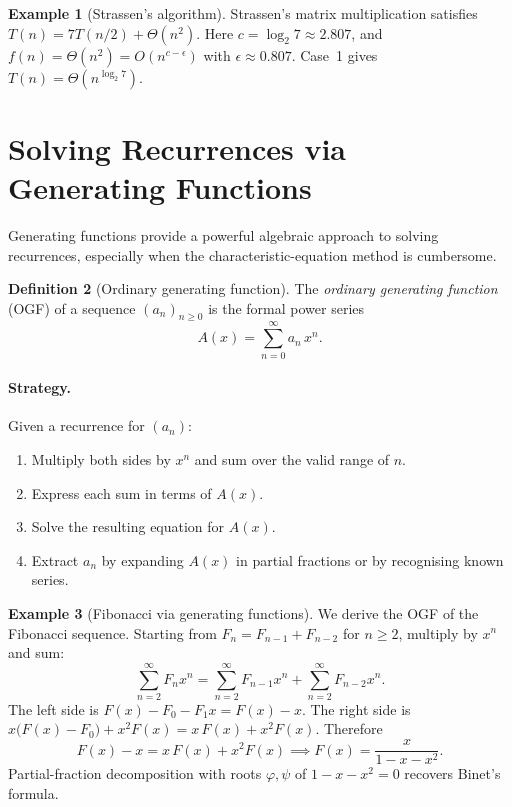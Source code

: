 \documentclass[12pt,a4paper,openany]{book}
\theoremstyle{definition}
\newtheorem{definition}{Definition}[chapter]
\newtheorem{example}[definition]{Example}
\theoremstyle{plain}
\theoremstyle{remark}
\begin{document}
\begin{example}[Strassen's algorithm]\label{ex:strassen}
Strassen's matrix multiplication satisfies $T(n) = 7T(n/2) + \Theta(n^2)$.
Here $c = \log_2 7 \approx 2.807$, and $f(n) = \Theta(n^2) =
O(n^{c - \epsilon})$ with $\epsilon \approx 0.807$.  Case~1 gives
$T(n) = \Theta(n^{\log_2 7})$.
\end{example}

\section{Solving Recurrences via Generating Functions}\label{sec:rec-gf}

Generating functions provide a powerful algebraic approach to solving
recurrences, especially when the characteristic-equation method is
cumbersome.

\begin{definition}[Ordinary generating function]\label{def:ogf}
The \emph{ordinary generating function} (OGF) of a sequence
$(a_n)_{n \ge 0}$ is the formal power series
\[
   A(x) = \sum_{n=0}^{\infty} a_n\, x^n.
\]
\end{definition}

\paragraph{Strategy.}
Given a recurrence for $(a_n)$:
\begin{enumerate}
\item Multiply both sides by $x^n$ and sum over the valid range of $n$.
\item Express each sum in terms of $A(x)$.
\item Solve the resulting equation for $A(x)$.
\item Extract $a_n$ by expanding $A(x)$ in partial fractions or by
      recognising known series.
\end{enumerate}

\begin{example}[Fibonacci via generating functions]\label{ex:fib-gf}
We derive the OGF of the Fibonacci sequence.  Starting from
$F_n = F_{n-1} + F_{n-2}$ for $n \ge 2$, multiply by $x^n$ and sum:
\[
   \sum_{n=2}^{\infty} F_n x^n
   = \sum_{n=2}^{\infty} F_{n-1} x^n
   + \sum_{n=2}^{\infty} F_{n-2} x^n.
\]
The left side is $F(x) - F_0 - F_1 x = F(x) - x$.  The right side is
$x\bigl(F(x) - F_0\bigr) + x^2 F(x) = x\, F(x) + x^2 F(x)$.
Therefore
\[
   F(x) - x = x\, F(x) + x^2 F(x)
   \implies F(x) = \frac{x}{1 - x - x^2}.
\]
Partial-fraction decomposition with roots $\varphi, \psi$ of
$1 - x - x^2 = 0$ recovers Binet's formula.
\end{example}
\end{document}
